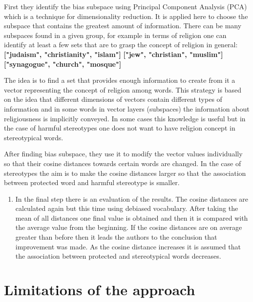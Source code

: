 \documentclass[12pt,]{book}
\providecommand{\tightlist}{%
  \setlength{\itemsep}{0pt}\setlength{\parskip}{0pt}}
\begin{document}
First they identify the bias subspace using Principal Component Analysis
(PCA) which is a technique for dimensionality reduction. It is applied
here to choose the subspace that contains the greatest amount of
information. There can be many subspaces found in a given group, for
example in terms of religion one can identify at least a few sets that
are to grasp the concept of religion in general: \newline
\textbf{["judaism", "christianity", "islam"]} \newline
\textbf{["jew", "christian", "muslim"]} \newline
\textbf{["synagogue", "church", "mosque"]} \newline

The idea is to find a set that provides enough information to create
from it a vector representing the concept of religion among words. This
strategy is based on the idea that different dimensions of vectors
contain different types of information and in some words in vector
layers (subspaces) the information about religiousness is implicitly
conveyed. In some cases this knowledge is useful but in the case of
harmful stereotypes one does not want to have religion concept in
stereotypical words.

After finding bias subspace, they use it to modify the vector values
individually so that their cosine distances towards certain words are
changed. In the case of stereotypes the aim is to make the cosine
distances larger so that the association between protected word and
harmful stereotype is smaller.

\begin{enumerate}
\def\labelenumi{\arabic{enumi}.}
\setcounter{enumi}{3}
\tightlist
\item
  In the final step there is an evaluation of the results. The cosine
  distances are calculated again but this time using debiased
  vocabulary. After taking the mean of all distances one final value is
  obtained and then it is compared with the average value from the
  beginning. If the cosine distances are on average greater than before
  then it leads the authors to the conclusion that improvement was made.
  As the cosine distance increases it is assumed that the association
  between protected and stereotypical words decreases.
\end{enumerate}

\section{Limitations of the approach}\label{limitations-of-the-approach}
\end{document}
